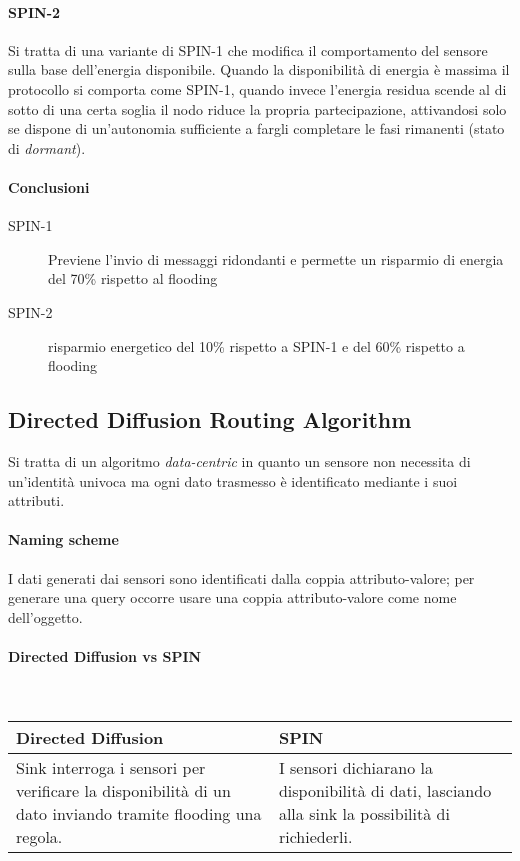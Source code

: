 \paragraph{SPIN-2}
	Si tratta di una variante di SPIN-1 che modifica il comportamento del sensore sulla base dell'energia disponibile.
	Quando la disponibilità di energia è massima il protocollo si comporta come SPIN-1, quando invece l'energia residua scende al di sotto di una certa soglia il nodo riduce la propria partecipazione, attivandosi solo se dispone di un'autonomia sufficiente a fargli completare le fasi rimanenti (stato di \emph{dormant}).
	
\paragraph{Conclusioni}
	\begin{description}
		\item[SPIN-1] Previene l'invio di messaggi ridondanti e permette un risparmio di energia del 70\% rispetto al flooding
		\item[SPIN-2] risparmio energetico del 10\% rispetto a SPIN-1 e del 60\% rispetto a flooding
	\end{description}
	
	
\subsection{Directed Diffusion Routing Algorithm}

	Si tratta di un algoritmo \emph{data-centric} in quanto un sensore non necessita di un'identità univoca ma ogni dato trasmesso è identificato mediante i suoi attributi.
	
\paragraph{Naming scheme}
	I dati generati dai sensori sono identificati dalla coppia attributo-valore; per generare una query occorre usare una coppia attributo-valore come nome dell'oggetto.
	
\paragraph{Directed Diffusion vs SPIN} \mbox{}\\[1ex]
	\begin{tabularx}{\textwidth}{XX}
		\toprule
		Directed Diffusion & SPIN\\
		\midrule
		Sink interroga i sensori per verificare la disponibilità di un dato inviando tramite flooding una regola. & I sensori dichiarano la disponibilità di dati, lasciando alla sink la possibilità di richiederli.\\
		\bottomrule
	\end{tabularx}

